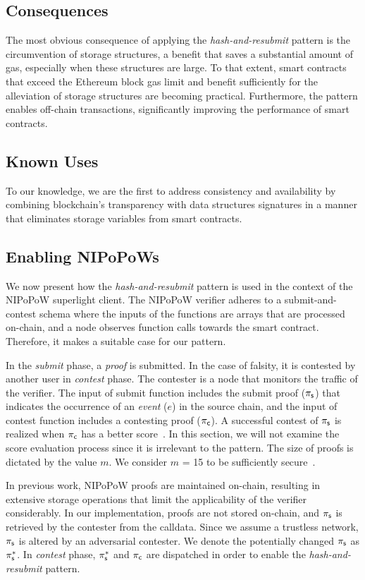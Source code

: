 \subsection{Consequences} The most obvious consequence of applying the
\emph{hash-and-resubmit} pattern is the circumvention of storage
structures, a benefit that saves a substantial amount of gas, especially when
these structures are large. To that extent, smart contracts that exceed the
Ethereum block gas limit and benefit sufficiently for the alleviation of
storage structures are becoming practical. Furthermore, the pattern enables
off-chain transactions, significantly improving the performance of smart
contracts.

\subsection{Known Uses} To our knowledge, we are the first to address
consistency and availability by combining blockchain's transparency with data
structures signatures in a manner that eliminates storage variables from
smart contracts.

\subsection{Enabling NIPoPoWs} We now present how the
\emph{hash-and-resubmit} pattern is used in the context of the NIPoPoW
superlight client. The NIPoPoW verifier adheres to a submit-and-contest schema
where the inputs of the functions are arrays that are processed on-chain, and a
node observes function calls towards the smart contract.  Therefore, it
makes a suitable case for our pattern.

In the \emph{submit} phase, a \emph{proof} is submitted. In the case of falsity, it
is contested by another user in \emph{contest} phase. The contester is a node
that monitors the traffic of the verifier. The input of \textsf{submit}
function includes the submit proof ($\mathsf{\pi_{s}}$) that indicates the occurrence of an
\emph{event} ($e$) in the source chain, and the input of \textsf{contest}
function includes a contesting proof ($\mathsf{\pi_{c}}$). A successful contest of $\mathsf{\pi_{s}}$
is realized when $\mathsf{\pi_{c}}$ has a better score~\cite{nipopows}. In this section, we
will not examine the score evaluation process since it is irrelevant to the
pattern. The size of proofs is dictated by the value $m$. We consider $m$ = 15
to be sufficiently secure~\cite{nipopows}.

In previous work, NIPoPoW proofs are maintained on-chain, resulting in
extensive storage operations that limit the applicability of the verifier
considerably. In our implementation, proofs are not stored on-chain, and $\mathsf{\pi_{s}}$
is retrieved by the contester from the calldata. Since we
assume a trustless network, $\mathsf{\pi_{s}}$ is altered by an adversarial contester. We denote
the potentially changed $\mathsf{\pi_{s}}$ as $\mathsf{\pi_{s}^*}$. In \emph{contest} phase, $\mathsf{\pi_{s}^*}$ and
$\mathsf{\pi_{c}}$ are dispatched in order to enable the \emph{hash-and-resubmit} pattern.

